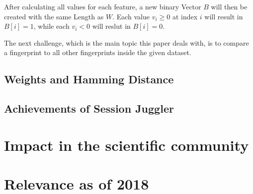 \documentclass[12pt,a4paper,DIV=calc]{scrartcl}
\begin{document}
After calculating all values for each feature, a new binary Vector $B$ will then be created with the same Length as $W$.
Each value $v_i \geq 0$ at index $i$ will result in $B[i] = 1$, while each $v_i < 0$ will reslut in $B[i] = 0$.

The next challenge, which is the main topic this paper deals with, is to compare a fingerprint to all other fingerprints inside the given dataset.

\subsection{Weights and Hamming Distance}



\subsection{}



\subsection{Achievements of Session Juggler}


\section{Impact in the scientific community}


\section{Relevance as of 2018}


\printbibliography
\end{document}
